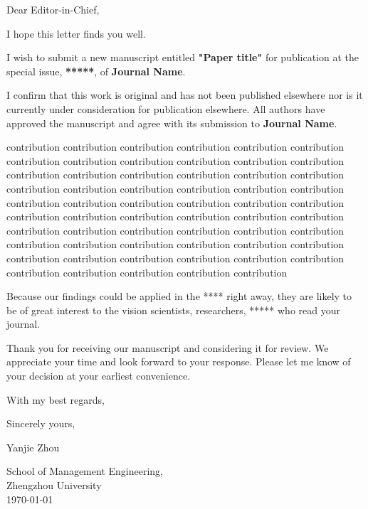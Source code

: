 \documentclass[12pt,a4paper]{scrlttr2} %
\def\Where{School of Management Engineering} %
\def\Institution{Zhengzhou University} %
\def\JournalName{\textbf{Journal Name}}
\begin{document}
	
	\begin{letter}{}  
		\date{}
 
\vspace{15mm}   
 \begin{flushleft}
 Dear Editor-in-Chief,
 \end{flushleft}
 
 I hope this letter finds you well.		 

		I wish to submit a new manuscript entitled \textbf{"Paper title" } for publication at the special issue, \textbf{*****}, of \JournalName.	 

		I confirm that this work is original and has not been published elsewhere nor is it currently under consideration for publication elsewhere. All authors have approved the manuscript and agree with its submission to \JournalName. 		 

		contribution 		contribution contribution contribution contribution contribution contribution contribution contribution contribution
		contribution contribution contribution contribution contribution contribution contribution contribution contribution contribution contribution contribution contribution contribution contribution
		contribution contribution contribution contribution contribution contribution
		contribution contribution contribution
				contribution 		contribution contribution contribution contribution contribution contribution contribution contribution contribution
		contribution contribution contribution contribution contribution contribution contribution contribution contribution contribution contribution contribution contribution contribution contribution	
		
		Because our findings could be applied in the **** right away, they are likely to be of great interest to the vision scientists, researchers, ***** who read your journal.	
			
		Thank you for receiving our manuscript and considering it for review. We appreciate your time and look forward to your response. Please let me know of your decision at your earliest convenience.

\begin{flushleft}
			With my best regards,	
 \end{flushleft}
 
		\closing{Sincerely yours,}

\begin{flushleft}
{
\sffamily \calligra
{}
\fontsize{25}{10}
\selectfont Yanjie Zhou\\[3mm]
}			
\end{flushleft}

     
	\noindent	\Where ,\\
		\Institution \\
\today  
	\end{letter}
 	
\end{document}

